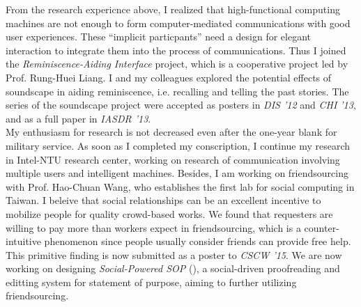 \noindent
From the research expericnce above, 
I realized that high-functional computing machines are not enough to form computer-mediated communications with good user experiences.
These ``implicit particpants'' need a design for elegant interaction to integrate them into the process of communications.
Thus I joined the \textit{Reminiscence-Aiding Interface} project, which is a cooperative project led by Prof. Rung-Huei Liang.
I and my colleagues explored the potential effects of soundscape in aiding reminiscence, i.e. recalling and telling the past stories.
The series of the soundscape project were accepted as posters in \textit{DIS '12} and \textit{CHI '13}, 
and as a full paper in \textit{IASDR '13}.\\


\noindent
My enthusiasm for research is not decreased even after the one-year blank for military service.
As soon as I completed my conscription, I continue my research in Intel-NTU research center,
working on research of communication involving multiple users and intelligent machines.
Besides, I am working on friendsourcing with Prof. Hao-Chuan Wang, who establishes the first lab for social computing in Taiwan.
I beleive that social relationships can be an excellent incentive to mobilize people for quality crowd-based works.
We found that requesters are willing to pay more than workers expect in friendsourcing,
which is a counter-intuitive phenomenon since people usually consider friends can provide free help.
This primitive finding is now submitted as a poster to \textit{CSCW '15}.
We are now working on designing \textit{Social-Powered SOP} (),
a social-driven proofreading and editting system for statement of purpose, aiming to further utilizing friendsourcing. \\





